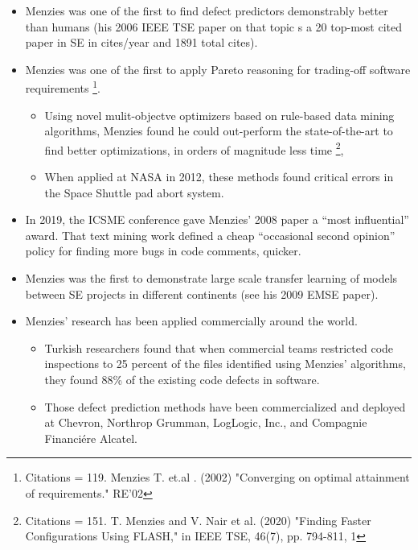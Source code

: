 \documentclass[10pt]{article}
\begin{document}
 \begin{itemize}
 \item
Menzies was one of the first to find defect predictors demonstrably better than humans (his 2006 IEEE TSE paper on that topic s a 20 top-most cited paper in SE in cites/year and 1891 total cites). 
\item
Menzies was one of the first to apply Pareto reasoning for trading-off software requirements 
\footnote{
 Citations = 119. 	Menzies T. et.al . (2002) "Converging on optimal attainment of requirements." RE’02 }. 
\begin{itemize} 
\item 
Using novel mulit-objectve optimizers based on rule-based data mining algorithms, Menzies found he could out-perform the state-of-the-art to find better optimizations, in orders of magnitude less time  \footnote{
 Citations = 151. T. Menzies and V. Nair et al. (2020)  "Finding Faster Configurations Using FLASH," in IEEE TSE, 46(7), pp. 794-811, 1 },


\item When applied at NASA in 2012, these methods found critical errors in the Space Shuttle pad abort system.
\end{itemize}
\item
In 2019, the ICSME conference gave Menzies’ 2008 paper a “most influential” award. That text mining work defined a cheap “occasional second opinion” policy for finding more bugs in code comments, quicker. 
\item
Menzies was the first to demonstrate large scale transfer learning of models between SE projects in different continents (see his 2009 EMSE paper).  
\item
Menzies' research has been applied commercially around the world. 
\begin{itemize}
    \item  
Turkish researchers found that when commercial teams restricted code inspections to 25 percent of the files identified using Menzies’ algorithms, they found 88\% of the existing code defects in software. 
\item Those defect prediction methods have been commercialized and deployed at 
Chevron, Northrop Grumman, LogLogic, Inc., and Compagnie Financi\'ere Alcatel.
\end{itemize}
\end{itemize}
\end{document}
